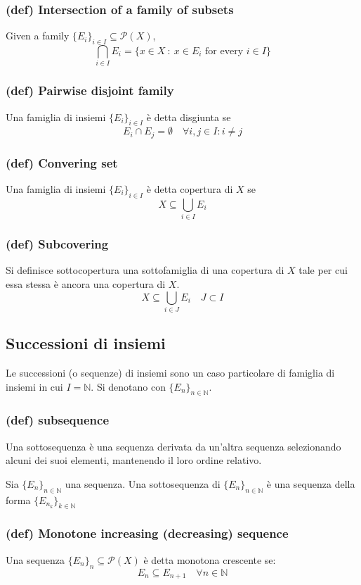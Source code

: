 \subsubsection{(def) Intersection of a family of subsets}
Given a family $\{E_i\}_{i\in I}\subseteq \mathcal P(X)$,
$$\bigcap_{i\in I} E_i = \{x\in X\ : \ x\in E_i \text{ for every } i\in I\}$$
\subsubsection{(def) Pairwise disjoint family}
Una famiglia di insiemi $\{E_i\}_{i\in I}$ è detta disgiunta se
$$E_i\cap E_j=\emptyset \quad \forall i,j\in I:i\neq j$$
\subsubsection{(def) Convering set}
Una famiglia di insiemi $\{E_i\}_{i\in I}$ è detta copertura di $X$ se $$X\subseteq \bigcup_{i\in I}E_i$$
\subsubsection{(def) Subcovering}
Si definisce sottocopertura una sottofamiglia di una copertura di $X$ tale per cui essa stessa è ancora una copertura di $X$.
$$X\subseteq \bigcup_{i\in J}E_i\quad J\subset I$$
\subsection{Successioni di insiemi}
Le successioni (o sequenze) di insiemi sono un caso particolare di famiglia di insiemi in cui $I=\mathbb N$. Si denotano con $\{E_n\}_{n\in \mathbb N}$.
\subsubsection{(def) subsequence}
Una sottosequenza è una sequenza derivata da un'altra sequenza selezionando alcuni dei suoi elementi, mantenendo il loro ordine relativo.

Sia $\{E_n\}_{n\in \mathbb N}$ una sequenza. Una sottosequenza di $\{E_n\}_{n\in \mathbb N}$ è una sequenza della forma $\{E_{n_k}\}_{k\in \mathbb N}$
\subsubsection{(def) Monotone increasing (decreasing) sequence}
Una sequenza $ \{E_n\}_n\subseteq \mathcal P(X)$ è detta monotona crescente se:
$$E_{n}\subseteq E_{n+1} \quad \forall n \in \mathbb N$$

